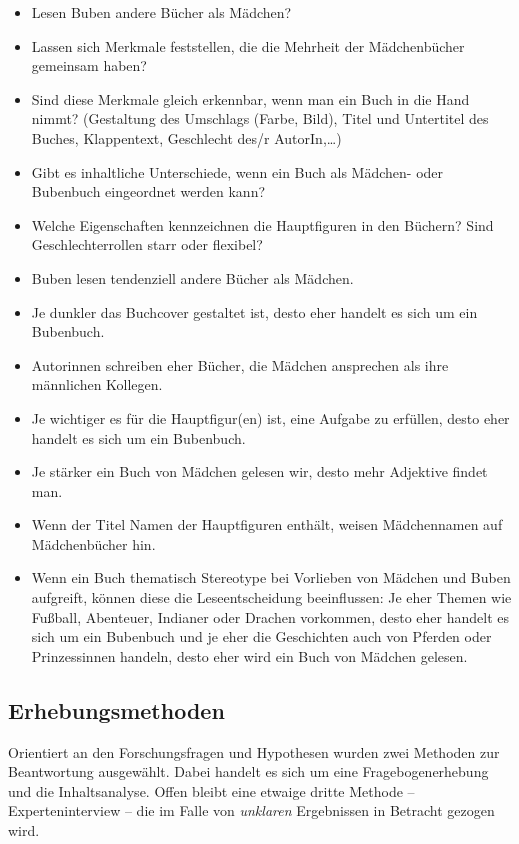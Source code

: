   \begin{itemize}     \item Lesen Buben andere Bücher als Mädchen?     \item
Lassen sich Merkmale feststellen, die die Mehrheit der Mädchenbücher gemeinsam
haben?     \item Sind diese Merkmale gleich erkennbar, wenn man ein Buch in die
Hand nimmt? (Gestaltung des Umschlags (Farbe, Bild), Titel und Untertitel des
Buches, Klappentext, Geschlecht des/r AutorIn,\ldots)     \item Gibt es
inhaltliche Unterschiede, wenn ein Buch als Mädchen- oder Bubenbuch eingeordnet
werden kann?      \item Welche Eigenschaften kennzeichnen die Hauptfiguren in
den Büchern? Sind Geschlechterrollen starr oder flexibel?   \end{itemize}

     \begin{itemize}     \item Buben lesen tendenziell
andere Bücher als Mädchen.     \item Je dunkler das Buchcover gestaltet ist,
desto eher handelt es sich um ein Bubenbuch.     \item Autorinnen schreiben eher
Bücher, die Mädchen ansprechen als ihre männlichen Kollegen.     \item Je
wichtiger es für die Hauptfigur(en) ist, eine Aufgabe zu erfüllen, desto eher
handelt es sich um ein Bubenbuch.     \item Je stärker ein Buch von Mädchen
gelesen wir, desto mehr Adjektive findet man.     \item Wenn der Titel Namen der
Hauptfiguren enthält, weisen Mädchennamen auf Mädchenbücher hin.     \item Wenn
ein Buch thematisch Stereotype bei Vorlieben von Mädchen und Buben aufgreift,
können diese die Leseentscheidung beeinflussen: Je eher Themen wie Fußball,
Abenteuer, Indianer oder Drachen vorkommen, desto eher handelt es sich um ein
Bubenbuch und je eher die Geschichten  auch von Pferden oder Prinzessinnen
handeln, desto eher wird ein Buch von Mädchen gelesen.   \end{itemize}

  \subsection{Erhebungsmethoden}

    Orientiert an den Forschungsfragen und Hypothesen wurden zwei Methoden zur
    Beantwortung ausgewählt. Dabei handelt es sich um eine Fragebogenerhebung
    und die Inhaltsanalyse. Offen bleibt eine etwaige dritte Methode --
    Experteninterview -- die im Falle von \emph{unklaren} Ergebnissen in
    Betracht gezogen wird.

